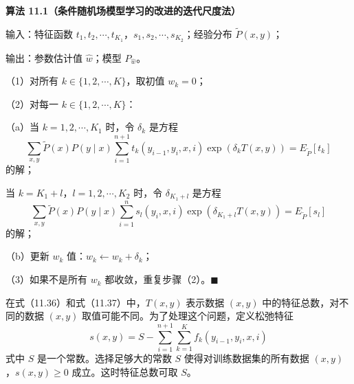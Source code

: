 \documentclass[UTF8,12pt,a4paper,fontset=fandol]{ctexart}
\begin{document}
\noindent\textbf{算法 11.1（条件随机场模型学习的改进的迭代尺度法）}

输入：特征函数 $t_1,t_2,\cdots,t_{K_1}$，$s_1,s_2,\cdots,s_{K_2}$；经验分布 $\tilde P(x,y)$；

输出：参数估计值 $\hat w$；模型 $P_{\hat w}$。

（1）对所有 $k\in\{1,2,\cdots,K\}$，取初值 $w_k=0$；

（2）对每一 $k\in\{1,2,\cdots,K\}$：

（a）当 $k=1,2,\cdots,K_1$ 时，令 $\delta_k$ 是方程
\[
\sum_{x,y}\tilde P(x)P(y\mid x)\sum_{i=1}^{n+1}t_k(y_{i-1},y_i,x,i)\exp(\delta_kT(x,y))=E_{\tilde P}[t_k]
\]
的解；

当 $k=K_1+l$，$l=1,2,\cdots,K_2$ 时，令 $\delta_{K_1+l}$ 是方程
\[
\sum_{x,y}\tilde P(x)P(y\mid x)\sum_{i=1}^{n}s_l(y_i,x,i)\exp(\delta_{K_1+l}T(x,y))=E_{\tilde P}[s_l]
\]
的解；

（b）更新 $w_k$ 值：$w_k\leftarrow w_k+\delta_k$；

（3）如果不是所有 $w_k$ 都收敛，重复步骤（2）。\hfill$\blacksquare$

在式（11.36）和式（11.37）中，$T(x,y)$ 表示数据 $(x,y)$ 中的特征总数，对不同的数据 $(x,y)$ 取值可能不同。为了处理这个问题，定义松弛特征
\begin{equation}
s(x,y)=S-\sum_{i=1}^{n+1}\sum_{k=1}^{K}f_k(y_{i-1},y_i,x,i)
\tag{11.39}
\end{equation}
式中 $S$ 是一个常数。选择足够大的常数 $S$ 使得对训练数据集的所有数据 $(x,y)$，$s(x,y)\ge0$ 成立。这时特征总数可取 $S$。
\end{document}
